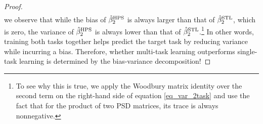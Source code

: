 \begin{proof}
\begin{align}
\end{align}
we observe that while the bias of $\hat{\beta}_2^{\textup{HPS}}$ is always larger than that of $\hat{\beta}_2^{\textup{STL}}$, which is zero, the variance of $\hat{\beta}_2^{\textup{HPS}}$ is always lower than that of $\hat{\beta}_2^{\textup{STL}}$.\footnote{To see why this is true, we apply the Woodbury matrix identity over the second term on the right-hand side of equation \eqref{eq_var_2task} and use the fact that for the product of two PSD matrices, its trace is always nonnegative.}
In other words, training both tasks together helps predict the target task by reducing variance while incurring a bias.
Therefore, whether multi-task learning outperforms single-task learning is determined by the bias-variance decomposition!



\end{proof}
